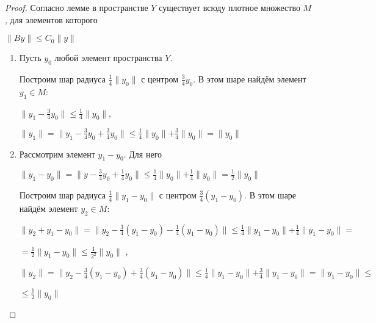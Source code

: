 \documentclass[12pt,a4paper,titlepage, oneside]{book}
\theoremstyle{definition}
\theoremstyle{plain}
\theoremstyle{remark}
\theoremstyle{remark}
\theoremstyle{remark}
\theoremstyle{remark}
\theoremstyle{plain}
\theoremstyle{plain}
\begin{document}
\begin{proof}
Согласно лемме в пространстве $Y$ существует всюду плотное множество $M$, для элементов которого
\begin{center}
	$\parallel By \parallel \leq C_0 \parallel y \parallel $
\end{center}
\begin{enumerate}

	\item Пусть $y_0$ любой элемент пространства $Y$.
	
	Построим шар радиуса $\frac{1}{4}\parallel y_0 \parallel$ с 		центром $\frac{3}{4}y_0$. В этом шаре найдём элемент
	$y_1 \in M$:
	\begin{center}
	$\parallel y_1 - \frac{3}{4}y_0\parallel \leq \frac{1}{4}    		\parallel y_0 \parallel $,
	\end{center}
	\begin{center}
	$\parallel y_1 \parallel =
	\parallel y_1 - \frac{3}{4}y_0 +
	\frac{3}{4}y_0 \parallel \leq \frac{1}{4} 			\parallel y_0 \parallel +
	 \frac{3}{4}\parallel y_0\parallel = 				\parallel y_0 \parallel$
	\end{center}
	
	\item Рассмотрим элемент $y_1 - y_0$. Для него
	\begin{center}
	$\parallel y_1-y_0 \parallel =\parallel y - \frac{3}{4}y_0 +
	\frac{1}{4}y_0 \parallel \leq
	\frac{1}{4} \parallel y_0 \parallel +
	\frac{1}{4} \parallel y_0 \parallel =
	\frac{1}{2} \parallel y_0 \parallel$
	\end{center}
	Построим шар радиуса $\frac{1}{4} \parallel 		y_1 - y_0 \parallel$ с центром $\frac{3}{4} (y_1 - y_0)$. В этом шаре найдём элемент $y_2 \in M$:
	\begin{center}
	$\parallel y_2 + y_1 - y_0 \parallel =
	\parallel y_2 - \frac{3}{4}(y_1 - y_0) -
	\frac{1}{4}(y_1 - y_0) \parallel \leq
	\frac{1}{4} \parallel y_1 - y_0 \parallel +
	\frac{1}{4} \parallel y_1 - y_0 \parallel = $
	\end{center}
	\begin{center}
	$ = \frac{1}{2} \parallel y_1 - y_0 \parallel 			\leq
	\frac{1}{2^2} \parallel y_0 \parallel$ ,
	\end{center}
	\begin{center}
	$\parallel y_2 \parallel =
	\parallel y_2 - \frac{3}{4}(y_1 - y_0) +
	\frac{3}{4}(y_1 - y_0) \parallel \leq
	\frac{1}{4} \parallel y_1 - y_0 \parallel +
	\frac{3}{4} \parallel y_1 - y_0 \parallel =
	 \parallel y_1 - y_0 \parallel \leq$
	 \end{center}
	\begin{center}
	 $ \leq \frac{1}{2} \parallel y_0 \parallel$
	\end{center}
	

\end{enumerate}
\end{proof}
\end{document}
